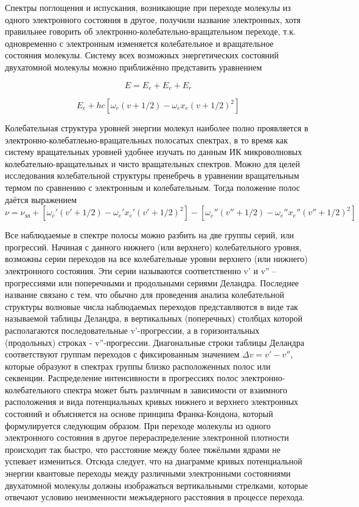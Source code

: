 Спектры поглощения и испускания, возникающие при переходе молекулы из
одного электронного состояния в другое, получили название электронных, хотя
правильнее говорить об электронно-колебательно-вращательном переходе, т.к.
одновременно с электронным изменяется колебательное и вращательное
состояния молекулы. Систему всех
возможных энергетических состояний двухатомной молекулы можно
приближённо представить уравнением

\begin{equation}
E = E_e+E_v+E_r
\end{equation}

$$
E_e + hc\left[\omega_e(v+1/2)-\omega_e x_e(v+1/2)^2\right]
$$

Колебательная структура уровней энергии молекул наиболее полно
проявляется в электронно-колебатлеьно-вращательных полосатых спектрах, в
то время как систему вращательных уровней удобнее изучать по данным ИК
микроволновых колебательно-вращательных и чисто вращательных спектров.
Можно для целей исследования колебательной
структуры пренебречь в уравнении  вращательным термом по сравнению с
электронным и колебательным. Тогда положение полос даётся выражением
\begin{equation}
\nu = \nu_{\text{эл}} + \left[\omega_e'(v'+1/2)-\omega_e' x_e'(v'+1/2)^2\right]-\left[\omega_e''(v''+1/2)-\omega_e'' x_e''(v''+1/2)^2\right]
\end{equation}


Все наблюдаемые в спектре полосы можно разбить на две
группы серий, или прогрессий. Начиная с данного нижнего (или верхнего)
колебательного уровня, возможны серии переходов на все колебательные
уровни верхнего (или нижнего) электронного состояния. Эти серии называются
соответственно v' и v'' --прогрессиями или поперечными и продольными
сериями Деландра. Последнее название связано с тем, что обычно для
проведения анализа колебательной структуры волновые числа наблюдаемых
переходов представляются в виде так называемой таблицы Деландра, в
вертикальных (поперечных) столбцах которой располагаются
последовательные v'-прогрессии, а в горизонтальных (продольных) строках -
v''-прогрессии. Диагональные строки таблицы Деландра соответствуют
группам переходов с фиксированным значением $\Delta v = v' - v''$, которые образуют в
спектрах группы близко расположенных полос или секвенции.
Распределение интенсивности в прогрессиях полос электронно-колебательного
спектра может быть различным в зависимости от взаимного расположения и
вида потенциальных кривых нижнего и верхнего электронных состояний и
объясняется на основе принципа Франка-Кондона, который формулируется
следующим образом. При переходе молекулы из одного электронного
состояния в другое перераспределение электронной плотности происходит так
быстро, что расстояние между более тяжёлыми ядрами не успевает измениться.
Отсюда следует, что на диаграмме кривых потенциальной энергии
квантовые переходы между различными электронными состояниями
двухатомной молекулы должны изображаться вертикальными стрелками,
которые отвечают условию неизменности межъядерного расстояния в процессе
перехода.




